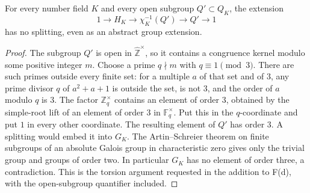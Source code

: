 \begin{proposition}
\label{F-no-cyclo-split}
For every number field $K$ and every open subgroup $Q'\subset Q_K$,
the extension
\[
 1\longrightarrow H_K\longrightarrow\chi_K^{-1}(Q')
       \longrightarrow Q'\longrightarrow1
\]
has no splitting, even as an abstract group extension.
\end{proposition}
\begin{proof}
The subgroup $Q'$ is open in $\widehat{\mathbb Z}^{\times}$, so it
contains a congruence kernel modulo some positive integer $m$.
Choose a prime $q\nmid m$ with $q\equiv1\pmod3$. There are such
primes outside every finite set: for a multiple $a$ of that set
and of $3$, any prime divisor $q$ of $a^2+a+1$ is outside the set,
is not $3$, and the order of $a$ modulo $q$ is $3$.
The factor $\mathbb Z_q^{\times}$ contains an element of order
$3$, obtained by the simple-root lift of an element of order $3$
in $\mathbb F_q^{\times}$. Put this in the $q$-coordinate and put
$1$ in every other coordinate. The resulting element of $Q'$
has order $3$. A splitting would embed it into $G_K$. The
Artin--Schreier theorem on finite subgroups of an absolute Galois
group in characteristic zero gives only the trivial group and
groups of order two. In particular $G_K$ has no element of order
three, a contradiction. This is the torsion argument requested
in the addition to F(d), with the open-subgroup quantifier included.
\end{proof}

